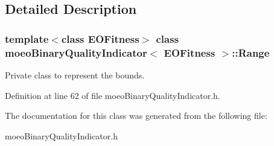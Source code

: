 \subsection{Detailed Description}
\subsubsection*{template$<$class EOFitness$>$ class moeo\-Binary\-Quality\-Indicator$<$ EOFitness $>$::Range}

Private class to represent the bounds. 



Definition at line 62 of file moeo\-Binary\-Quality\-Indicator.h.

The documentation for this class was generated from the following file:\begin{CompactItemize}
\item 
moeo\-Binary\-Quality\-Indicator.h\end{CompactItemize}
